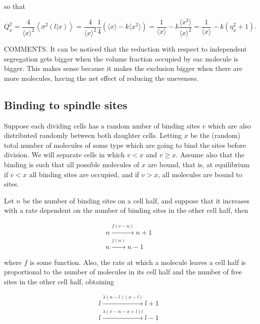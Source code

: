 so that

\begin{equation}
  Q_x^2 = \frac{4}{\langle x\rangle^2}\left\langle \sigma^2(l|x)\right\rangle = \frac{4}{\langle x\rangle^2}\frac{1}{4}\left(\langle x\rangle-k\langle x^2\rangle\right) = \frac{1}{\langle x\rangle} - k\frac{\langle x^2\rangle}{\langle x\rangle^2} = \frac{1}{\langle x\rangle} - k(\eta_x^2+1).
\end{equation}

COMMENTS. It can be noticed that the reduction with respect to independent segregation gets bigger when the volume fraction occupied by eac molecule is bigger. This makes sense because it makes the exclusion bigger when there are more molecules, having the net effect of reducing the uneveness.

\subsection{Binding to spindle sites}

Suppose each dividing cells has a random nmber of binding sites $v$ which are also distributed randomly between both daughter cells. Letting $x$ be the (random) total number of molecules of some type which are going to bind the sites before division. We will separate cells in which $v<x$ and $v\geq x$. Assume also that the binding is such that all possible molecules of $x$ are bound, that is, at equilibrium if $v<x$ all binding sites are occupied, and if $v>x$, all molecules are bound to sites.

Let $n$ be the number of binding sites on a cell half, and suppose that it increases with a rate dependent on the number of binding sites in the other cell half, then

\begin{equation}
  \begin{split}
    n\xrightarrow{f(v-n)}n+1\\
    n\xrightarrow{f(n)}n-1
  \end{split}
\end{equation}

where $f$ is some function. Also, the rate at which a molecule leaves a cell half is proportional to the number of molecules in its cell half and the number of free sites in the other cell half, obtaining

\begin{equation}
  \begin{split}
    l\xrightarrow{\lambda(n-l)(x-l)}l+1\\
    l\xrightarrow{\lambda(v-n-x+l)l}l-1
  \end{split}
\end{equation}

